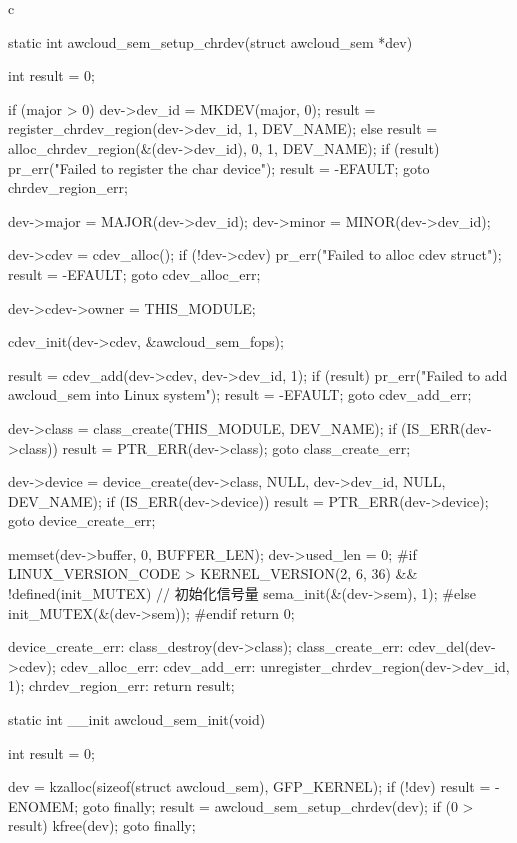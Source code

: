 \begin{code-block}{c}
{static int awcloud_sem_setup_chrdev(struct awcloud_sem *dev)
{
        int result = 0;

        if (major > 0) {
                dev->dev_id = MKDEV(major, 0);
                result = register_chrdev_region(dev->dev_id, 1, DEV_NAME);
        } else {
                result = alloc_chrdev_region(&(dev->dev_id), 0, 1, DEV_NAME);
        }
        if (result) {
                pr_err("Failed to register the char device\n");
                result = -EFAULT;
                goto chrdev_region_err;
        }

        dev->major = MAJOR(dev->dev_id);
        dev->minor = MINOR(dev->dev_id);

        dev->cdev = cdev_alloc();
        if (!dev->cdev) {
                pr_err("Failed to alloc cdev struct\n");
                result = -EFAULT;
                goto cdev_alloc_err;
        }

        dev->cdev->owner = THIS_MODULE;

        cdev_init(dev->cdev, &awcloud_sem_fops);

        result = cdev_add(dev->cdev, dev->dev_id, 1);
        if (result) {
                pr_err("Failed to add awcloud_sem into Linux system\n");
                result = -EFAULT;
                goto cdev_add_err;
        }

        dev->class = class_create(THIS_MODULE, DEV_NAME);
        if (IS_ERR(dev->class)) {
                result = PTR_ERR(dev->class);
                goto class_create_err;
        }

        dev->device = device_create(dev->class, NULL,
                dev->dev_id, NULL, DEV_NAME);
        if (IS_ERR(dev->device)) {
                result = PTR_ERR(dev->device);
                goto device_create_err;
        }

        memset(dev->buffer, 0, BUFFER_LEN);
        dev->used_len = 0;
#if LINUX_VERSION_CODE > KERNEL_VERSION(2, 6, 36) && !defined(init_MUTEX)
        // 初始化信号量
        sema_init(&(dev->sem), 1);
#else
        init_MUTEX(&(dev->sem));
#endif
        return 0;

device_create_err:
        class_destroy(dev->class);
class_create_err:
        cdev_del(dev->cdev);
cdev_alloc_err:
cdev_add_err:
        unregister_chrdev_region(dev->dev_id, 1);
chrdev_region_err:
        return result;
}

static int __init awcloud_sem_init(void)
{
        int result = 0;

        dev = kzalloc(sizeof(struct awcloud_sem), GFP_KERNEL);
        if (!dev) {
                result = -ENOMEM;
                goto finally;
        }
        result = awcloud_sem_setup_chrdev(dev);
        if (0 > result) {
                kfree(dev);
                goto finally;
        }

}}
\end{code-block}
